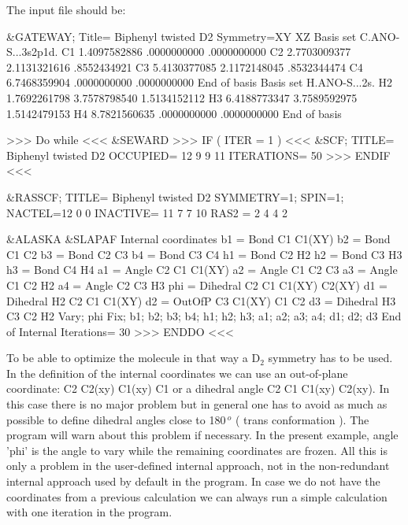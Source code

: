The input file should be:

\begin{inputlisting}
  &GATEWAY; Title= Biphenyl twisted D2
   Symmetry=XY XZ
   Basis set
   C.ANO-S...3s2p1d.
   C1             1.4097582886         .0000000000         .0000000000
   C2             2.7703009377        2.1131321616         .8552434921
   C3             5.4130377085        2.1172148045         .8532344474
   C4             6.7468359904         .0000000000         .0000000000
   End of basis
   Basis set
   H.ANO-S...2s.
   H2             1.7692261798        3.7578798540        1.5134152112
   H3             6.4188773347        3.7589592975        1.5142479153
   H4             8.7821560635         .0000000000         .0000000000
   End of basis

>>> Do while <<<
 &SEWARD
>>> IF ( ITER = 1 ) <<<
 &SCF; TITLE= Biphenyl twisted D2
   OCCUPIED= 12 9 9 11
   ITERATIONS= 50
>>> ENDIF <<<

 &RASSCF; TITLE= Biphenyl twisted D2
   SYMMETRY=1; SPIN=1; NACTEL=12    0    0
   INACTIVE= 11    7    7   10
   RAS2    =  2    4    4    2

 &ALASKA
 &SLAPAF
Internal coordinates
b1 = Bond C1 C1(XY)
b2 = Bond C1 C2
b3 = Bond C2 C3
b4 = Bond C3 C4
h1 = Bond C2 H2
h2 = Bond C3 H3
h3 = Bond C4 H4
a1 = Angle C2 C1 C1(XY)
a2 = Angle C1 C2 C3
a3 = Angle C1 C2 H2
a4 = Angle C2 C3 H3
phi = Dihedral C2 C1 C1(XY) C2(XY)
d1 = Dihedral H2 C2 C1 C1(XY)
d2 = OutOfP C3 C1(XY) C1 C2
d3 = Dihedral H3 C3 C2 H2
Vary; phi
Fix; b1; b2; b3; b4; h1; h2; h3; a1; a2; a3; a4; d1; d2; d3
End of Internal
Iterations= 30
>>> ENDDO <<<
\end{inputlisting}

To be able to optimize the molecule in that way a D$_2$ symmetry
has to be used. In the definition of the internal coordinates
we can use an out-of-plane coordinate: C2 C2(xy) C1(xy) C1 or
a dihedral angle
C2 C1 C1(xy) C2(xy). In this case there is no major problem but
in general one has to avoid as much as possible to define 
dihedral angles close to 180$\,^o$ ( trans conformation ). 
The  program will warn about this problem if necessary.
In the present example, angle 'phi' is the angle to vary
while the remaining coordinates are frozen. All this is only
a problem in the user-defined internal approach, not in the
non-redundant internal approach used by default in the program.
In case we do not have the coordinates from a previous calculation
we can always run a simple calculation with one iteration
in the  program.

